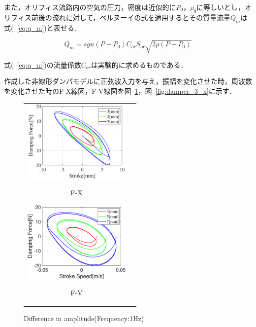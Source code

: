 \documentclass[a4paper,12pt]{article_vdlab_sotsuron}
\begin{document}
また，オリフィス流路内の空気の圧力，密度は近似的に$P_0$，$\rho_0$に等しいとし，オリフィス前後の流れに対して，ベルヌーイの式を適用するとその質量流量$Q_m$は式(~\ref{eq:q_m})と表せる．

\begin{equation}
  Q_m = sgn\left(P - P_0 \right)C_{or}S_{or}\sqrt{2 \rho \left(P-P_0 \right)} \label{eq:q_m}
\end{equation}

式(~\ref{eq:q_m})の流量係数$C_{or}$は実験的に求めるものである．

\newpage
作成した非線形ダンパモデルに正弦波入力を与え，振幅を変化させた時，周波数を変化させた時のF-X線図，F-V線図を図~\ref{fig:damper_x_3}，図~\ref{fig:damper_3_x}に示す．

\vspace*{5mm}
\begin{figure}[h]
  \begin{tabular}{cc}
  \begin{minipage}{0.5\hsize}
  \begin{center}
    \includegraphics[height=40mm]{figure/damper_x_1_Fx.eps}
    \end{center}
    \begin{center}
    \ F-X\
    \end{center}
  \end{minipage}
  \begin{minipage}{0.5\hsize}
     \begin{center}
      \includegraphics[height=40mm]{figure/damper_x_1_Fv.eps}
      \end{center}
      \begin{center}
      \ F-V\
    \end{center}
  \end{minipage}
  \end{tabular}
  \vspace*{3mm}
  \caption{Difference in amplitude(Frequency:1Hz)}
    \label{fig:damper_x_3}
\end{figure}
\end{document}

